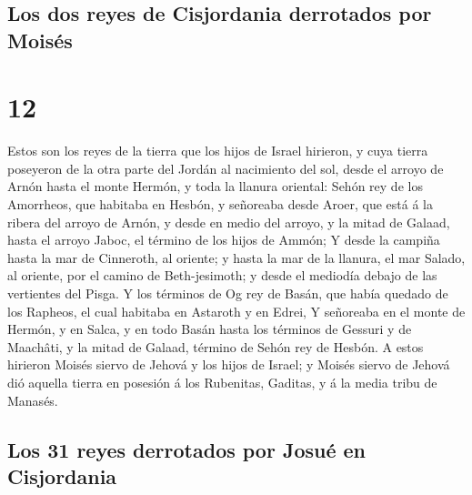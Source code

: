 \hypertarget{los-dos-reyes-de-cisjordania-derrotados-por-moisuxe9s}{%
\subsection{Los dos reyes de Cisjordania derrotados por
Moisés}\label{los-dos-reyes-de-cisjordania-derrotados-por-moisuxe9s}}

\hypertarget{section-06-12}{%
\section{12}\label{section-06-12}}

 Estos son los reyes de la tierra que los hijos de Israel
hirieron, y cuya tierra poseyeron de la otra parte del Jordán al
nacimiento del sol, desde el arroyo de Arnón hasta el monte Hermón, y
toda la llanura oriental:  Sehón rey de los Amorrheos, que
habitaba en Hesbón, y señoreaba desde Aroer, que está á la ribera del
arroyo de Arnón, y desde en medio del arroyo, y la mitad de Galaad,
hasta el arroyo Jaboc, el término de los hijos de Ammón; 
Y desde la campiña hasta la mar de Cinneroth, al oriente; y hasta la mar
de la llanura, el mar Salado, al oriente, por el camino de
Beth-jesimoth; y desde el mediodía debajo de las vertientes del Pisga.
 Y los términos de Og rey de Basán, que había quedado de
los Rapheos, el cual habitaba en Astaroth y en Edrei,  Y
señoreaba en el monte de Hermón, y en Salca, y en todo Basán hasta los
términos de Gessuri y de Maachâti, y la mitad de Galaad, término de
Sehón rey de Hesbón.  A estos hirieron Moisés siervo de
Jehová y los hijos de Israel; y Moisés siervo de Jehová dió aquella
tierra en posesión á los Rubenitas, Gaditas, y á la media tribu de
Manasés.

\hypertarget{los-31-reyes-derrotados-por-josuuxe9-en-cisjordania}{%
\subsection{Los 31 reyes derrotados por Josué en
Cisjordania}\label{los-31-reyes-derrotados-por-josuuxe9-en-cisjordania}}

